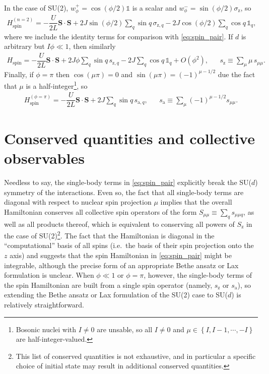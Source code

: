 \documentclass[nofootinbib,notitlepage,11pt]{revtex4-2}
\renewcommand{\t}{\text} %
\newcommand{\f}[2]{\dfrac{#1}{#2}} %
\newcommand{\p}[1]{\left(#1\right)} %
\renewcommand{\set}[1]{\left\{#1\right\}} %
\renewcommand{\v}{\bm} %
\renewcommand{\c}{\cdot} %
\newcommand{\1}{\mathds{1}}
\renewcommand{\a}{\text{a}}
\newcommand{\z}{\text{z}}
\begin{document}
In the case of SU(2), $w_\phi^+=\cos\p{\phi/2}\1$ is a scalar and $w_\phi^-=\sin\p{\phi/2}\sigma_\z$, so
\begin{align}
  H_{\t{spin}}^{(n=2)} = -\f{U}{2L} \v S\c\v S
  + 2J \sin\p{\phi/2} \sum_q \sin q\, \sigma_{\z,q}
  - 2J \cos\p{\phi/2} \sum_q \cos q\, \1_q,
\end{align}
where we include the identity terms for comparison with \eqref{eq:spin_pair}.
If $d$ is arbitrary but $I\phi\ll1$, then similarly
\begin{align}
  H_{\t{spin}} = -\f{U}{2L} \v S\c\v S
  + 2J \phi \sum_q \sin q\, s_{\z,q}
  - 2J \sum_q \cos q\, \1_q + O(\phi^2),
  &&
  s_\z \equiv \sum_\mu \mu\, s_{\mu\mu}.
\end{align}
Finally, if $\phi=\pi$ then $\cos\p{\mu\pi}=0$ and $\sin\p{\mu\pi}=\p{-1}^{\mu-1/2}$ due the fact that $\mu$ is a half-integer\footnote{Bosonic nuclei with $I\ne0$ are unsable, so all $I\ne0$ and $\mu\in\set{I,I-1,\cdots,-I}$ are half-integer-valued.}, so
\begin{align}
  H_{\t{spin}}^{(\phi=\pi)} = -\f{U}{2L} \v S\c\v S
  + 2J \sum_q \sin q\, s_{\a,q},
  &&
  s_\a \equiv \sum_\mu \p{-1}^{\mu-1/2} s_{\mu\mu}.
  \label{eq:spin_pi}
\end{align}

\section{Conserved quantities and collective observables}

Needless to say, the single-body terms in \eqref{eq:spin_pair} explicitly break the SU($d$) symmetry of the interactions.
Even so, the fact that all single-body terms are diagonal with respect to nuclear spin projection $\mu$ implies that the overall Hamiltonian conserves all collective spin operators of the form $S_{\mu\mu}\equiv\sum_q s_{\mu\mu q}$, as well as all products thereof, which is equivalent to conserving all powers of $S_\z$ in the case of SU(2)\footnote{This list of conserved quantities is not exhaustive, and in particular a specific choice of initial state may result in additional conserved quantities.}.
The fact that the Hamiltonian is diagonal in the ``computational'' basis of all spins (i.e.~the basis of their spin projection onto the $z$ axis) and suggests that the spin Hamiltonian in \eqref{eq:spin_pair} might be integrable, although the precise form of an appropriate Bethe ansatz or Lax formulation is unclear.
When $\phi\ll1$ or $\phi=\pi$, however, the single-body terms of the spin Hamiltonian are built from a single spin operator (namely, $s_\z$ or $s_\a$), so extending the Bethe ansatz or Lax formulation of the SU(2) case to SU($d$) is relatively straightforward.
\end{document}
